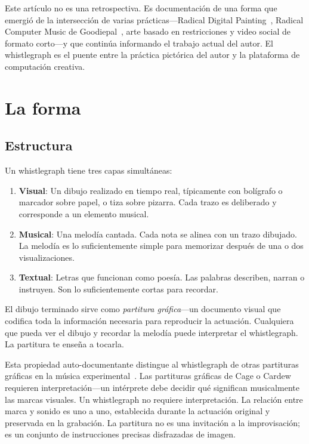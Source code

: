 \documentclass[10pt,letterpaper,twocolumn]{article}
\begin{document}
Este artículo no es una retrospectiva. Es documentación de una forma que emergió de la intersección de varias prácticas---Radical Digital Painting~\citep{scudder2017manifesto}, Radical Computer Music de Goodiepal~\citep{goodiepal2012elcamino}, arte basado en restricciones y video social de formato corto---y que continúa informando el trabajo actual del autor. El whistlegraph es el puente entre la práctica pictórica del autor y la plataforma de computación creativa.

\section{La forma}

\subsection{Estructura}

Un whistlegraph tiene tres capas simultáneas:

\begin{enumerate}
  \item \textbf{Visual}: Un dibujo realizado en tiempo real, típicamente con bolígrafo o marcador sobre papel, o tiza sobre pizarra. Cada trazo es deliberado y corresponde a un elemento musical.
  \item \textbf{Musical}: Una melodía cantada. Cada nota se alinea con un trazo dibujado. La melodía es lo suficientemente simple para memorizar después de una o dos visualizaciones.
  \item \textbf{Textual}: Letras que funcionan como poesía. Las palabras describen, narran o instruyen. Son lo suficientemente cortas para recordar.
\end{enumerate}

El dibujo terminado sirve como \emph{partitura gráfica}---un documento visual que codifica toda la información necesaria para reproducir la actuación. Cualquiera que pueda ver el dibujo y recordar la melodía puede interpretar el whistlegraph. La partitura te enseña a tocarla.

Esta propiedad auto-documentante distingue al whistlegraph de otras partituras gráficas en la música experimental~\citep{magnusson2010designing}. Las partituras gráficas de Cage o Cardew requieren interpretación---un intérprete debe decidir qué significan musicalmente las marcas visuales. Un whistlegraph no requiere interpretación. La relación entre marca y sonido es uno a uno, establecida durante la actuación original y preservada en la grabación. La partitura no es una invitación a la improvisación; es un conjunto de instrucciones precisas disfrazadas de imagen.
\end{document}

